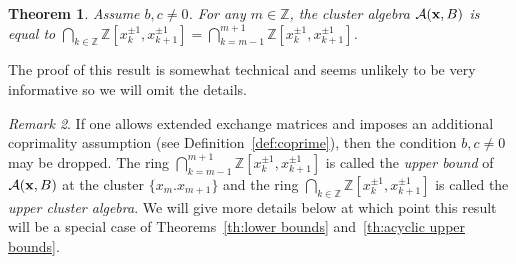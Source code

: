\documentclass{amsart}
\newtheorem{theorem}{Theorem}[section]
\theoremstyle{definition}
\theoremstyle{remark}
\newtheorem{remark}[theorem]{Remark}
\numberwithin{equation}{section}
\newcommand{\cA}{{\mathcal{A}}}
\newcommand{\bx}{{\bf x}}
\newcommand{\ZZ}{{\mathbb{Z}}}
\begin{document}
  \begin{theorem}
    Assume $b,c\ne0$.  For any $m\in\ZZ$, the cluster algebra $\cA(\bx,B)$ is equal to $\bigcap_{k\in\ZZ}\ZZ[x_k^{\pm1},x_{k+1}^{\pm1}]=\bigcap_{k=m-1}^{m+1}\ZZ[x_k^{\pm1},x_{k+1}^{\pm1}]$.
  \end{theorem}
  The proof of this result is somewhat technical and seems unlikely to be very informative so we will omit the details.
  \begin{remark}
    If one allows extended exchange matrices and imposes an additional coprimality assumption (see Definition~\ref{def:coprime}), then the condition $b,c\ne0$ may be dropped.  The ring $\bigcap_{k=m-1}^{m+1}\ZZ[x_k^{\pm1},x_{k+1}^{\pm1}]$ is called the \emph{upper bound} of $\cA(\bx,B)$ at the cluster $\{x_m.x_{m+1}\}$ and the ring $\bigcap_{k\in\ZZ}\ZZ[x_k^{\pm1},x_{k+1}^{\pm1}]$ is called the \emph{upper cluster algebra}.  We will give more details below at which point this result will be a special case of Theorems~\ref{th:lower bounds} and~\ref{th:acyclic upper bounds}.
  \end{remark}
\end{document}
